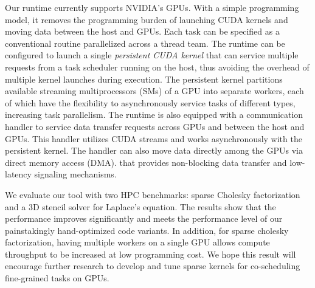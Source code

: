 Our runtime currently supports NVIDIA's GPUs.%
With a simple programming model, it removes the programming burden of launching CUDA kernels and moving data between the host and GPUs.
Each task can be specified as a conventional routine parallelized across a thread team.
The runtime can be configured to launch a single {\em persistent CUDA kernel} that can service multiple requests from a task scheduler running on the host, thus avoiding the overhead of multiple kernel launches during execution.
The persistent kernel partitions available streaming multiprocessors (SMs) of a GPU into separate workers, each of which have the flexibility to asynchronously service tasks of different types, increasing task parallelism.
The runtime is also equipped with a communication handler to service data transfer requests across GPUs and between the host and GPUs.
This handler utilizes CUDA streams and works asynchronously with the persistent kernel.
The handler can also move data directly among the GPUs via direct memory access (DMA).
that provides non-blocking data transfer and low-latency signaling mechanisms. %

We evaluate our tool with two HPC benchmarks: sparse Cholesky factorization and a 3D stencil solver for Laplace's equation.
The results show that the performance improves significantly and meets the performance level of our painstakingly hand-optimized code variants.
In addition, for sparse cholesky factorization, having multiple workers on a single GPU allows compute throughput to be increased at low programming cost. 
We hope this result will encourage further research to develop and tune sparse kernels for co-scheduling fine-grained tasks on GPUs.

